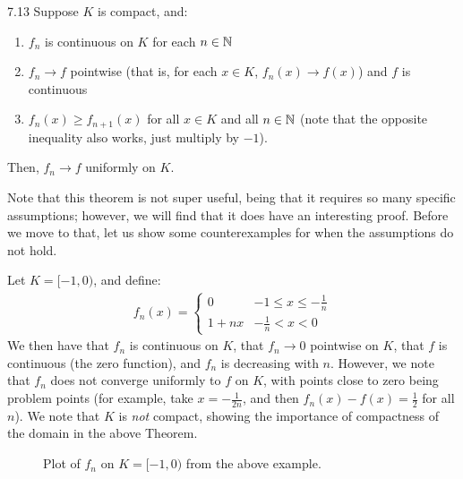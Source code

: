 \begin{theorem}{}{7.13}
    Suppose $K$ is compact, and:
    \begin{enumerate}
        \item $f_n$ is continuous on $K$ for each $n \in \mathbb{N}$
        \item $f_n \rightarrow f$ pointwise (that is, for each $x \in K$, $f_n(x) \rightarrow f(x)$) and $f$ is continuous
        \item $f_n(x) \geq f_{n+1}(x)$ for all $x \in K$ and all $n \in \mathbb{N}$ (note that the opposite inequality also works, just multiply by $-1$).
    \end{enumerate}
    Then, $f_n \rightarrow f$ uniformly on $K$. 
\end{theorem}
\noindent Note that this theorem is not super useful, being that it requires so many specific assumptions; however, we will find that it does have an interesting proof. Before we move to that, let us show some counterexamples for when the assumptions do not hold.

\begin{nexample}{}{}
    Let $K = [-1, 0)$, and define:
    \begin{align*}
        f_n(x) = \begin{cases}
            0 & -1 \leq x \leq -\frac{1}{n}
            \\ 1 + nx & -\frac{1}{n} < x < 0
        \end{cases}
    \end{align*}
    We then have that $f_n$ is continuous on $K$, that $f_n \rightarrow 0$ pointwise on $K$, that $f$ is continuous (the zero function), and $f_n$ is decreasing with $n$. However, we note that $f_n$ does not converge uniformly to $f$ on $K$, with points close to zero being problem points (for example, take $x = -\frac{1}{2n}$, and then $f_n(x) - f(x) = \frac{1}{2}$ for all $n$). We note that $K$ is \textit{not} compact, showing the importance of compactness of the domain in the above Theorem.
\end{nexample}
\begin{figure}[htbp]
    \centering
    
    \caption{Plot of $f_n$ on $K = [-1, 0)$ from the above example.}
    \label{fig43}
\end{figure}

